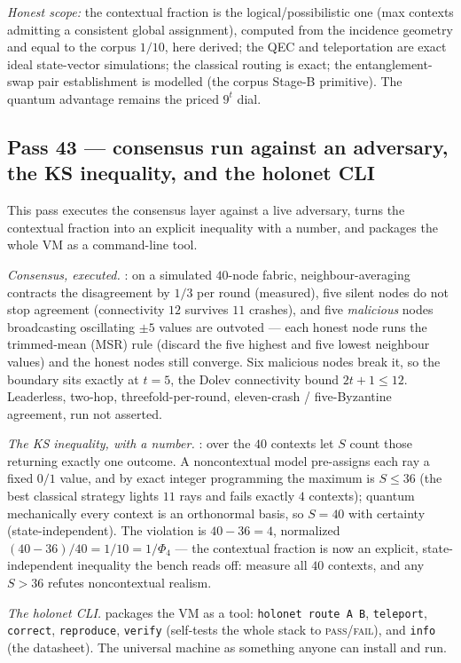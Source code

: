 \documentclass[11pt]{article}
\begin{document}
\emph{Honest scope:} the contextual fraction is the logical/possibilistic one (max contexts admitting a
consistent global assignment), computed from the incidence geometry and equal to the corpus $1/10$,
here derived; the QEC and teleportation are exact ideal state-vector simulations; the classical routing
is exact; the entanglement-swap pair establishment is modelled (the corpus Stage-B primitive). The
quantum advantage remains the priced $9^t$ dial.

\subsection{Pass 43 --- consensus run against an adversary, the KS inequality, and the holonet CLI}
\label{sec:capstone-fortythree}

This pass executes the consensus layer against a live adversary, turns the contextual fraction into an
explicit inequality with a number, and packages the whole VM as a command-line tool.

\emph{Consensus, executed.} : on a simulated $40$-node fabric,
neighbour-averaging contracts the disagreement by $1/3$ per round (measured), five silent nodes do not
stop agreement (connectivity $12$ survives $11$ crashes), and five \emph{malicious} nodes broadcasting
oscillating $\pm5$ values are outvoted --- each honest node runs the trimmed-mean (MSR) rule (discard
the five highest and five lowest neighbour values) and the honest nodes still converge. Six malicious
nodes break it, so the boundary sits exactly at $t=5$, the Dolev connectivity bound $2t+1\le12$.
Leaderless, two-hop, threefold-per-round, eleven-crash / five-Byzantine agreement, run not asserted.

\emph{The KS inequality, with a number.} : over the $40$ contexts
let $S$ count those returning exactly one outcome. A noncontextual model pre-assigns each ray a fixed
$0/1$ value, and by exact integer programming the maximum is $S\le36$ (the best classical strategy
lights $11$ rays and fails exactly $4$ contexts); quantum mechanically every context is an orthonormal
basis, so $S=40$ with certainty (state-independent). The violation is $40-36=4$, normalized
$(40-36)/40 = 1/10 = 1/\Phi_4$ --- the contextual fraction is now an explicit, state-independent
inequality the bench reads off: measure all $40$ contexts, and any $S>36$ refutes noncontextual realism.

\emph{The holonet CLI.}  packages the VM as a tool:
\texttt{holonet route A B}, \texttt{teleport}, \texttt{correct}, \texttt{reproduce}, \texttt{verify}
(self-tests the whole stack to \textsc{pass}/\textsc{fail}), and \texttt{info} (the datasheet). The
universal machine as something anyone can install and run.
\end{document}

